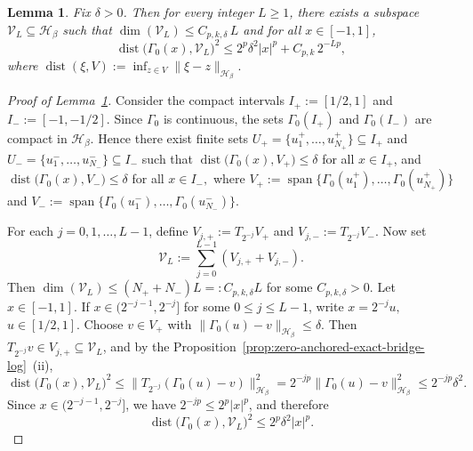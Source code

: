 \documentclass[11pt]{article}
\newtheorem{lemma}[theorem]{Lemma}
\theoremstyle{definition}
\begin{document}
\begin{lemma}\label{lem:dyadic-shell-approx-log}
Fix $\delta>0$. Then for every integer $L\ge 1$, there exists a subspace
\(
\mathcal V_L\subseteq \mathcal H_\beta
\)
such that
\(
\dim(\mathcal V_L)\le C_{p,k,\delta}\,L
\)
and for all \(x\in [-1,1]\),
\begin{equation}\label{eq:dyadic-shell-bound-log}
\operatorname{dist}\bigl(\Gamma_0(x),\mathcal V_L\bigr)^2
\le
2^p\delta^2 |x|^p + C_{p,k}\,2^{-Lp},
\end{equation}
where
\(
\operatorname{dist}(\xi,V):=\inf_{z\in V}\|\xi-z\|_{\mathcal H_\beta}.
\)
\end{lemma}
\begin{proof}[Proof of Lemma~\ref{lem:dyadic-shell-approx-log}]
    Consider the compact intervals
\(
I_+:=[1/2,1]\) and
\(
I_-:=[-1,-1/2].
\)
Since $\Gamma_0$ is continuous, the sets $\Gamma_0(I_+)$ and $\Gamma_0(I_-)$ are
compact in $\mathcal H_\beta$. Hence there exist finite sets
\(
U_+=\{u_1^+,\dots,u_{N_+}^+\}\subseteq I_+\)
and
\(
U_-=\{u_1^-,\dots,u_{N_-}^-\}\subseteq I_-
\)
such that
\(
\operatorname{dist}\bigl(\Gamma_0(x),V_+\bigr)\le \delta\) for all \(x\in I_+\), and
\(
\operatorname{dist}\bigl(\Gamma_0(x),V_-\bigr)\le \delta\) for all \(x\in I_{-},\)
where
\(
V_+:=\operatorname{span}\{\Gamma_0(u_1^+),\dots,\Gamma_0(u_{N_+}^+)\}
\)
and
\(
V_-:=\operatorname{span}\{\Gamma_0(u_1^-),\dots,\Gamma_0(u_{N_-}^-)\}.
\)

For each $j=0,1,\dots,L-1$, define
\(
V_{j,+}:=T_{2^{-j}}V_+\)
and
\(
V_{j,-}:=T_{2^{-j}}V_-.
\)
Now set
\[
\mathcal V_L:=\sum_{j=0}^{L-1}(V_{j,+}+V_{j,-}).
\]
Then
\(
\dim(\mathcal V_L)\le (N_++N_-)L=:C_{p,k,\delta}L
\) for some \(C_{p,k,\delta}>0.\) Let $x\in[-1,1]$. If $x\in(2^{-j-1},2^{-j}]$ for some $0\le j\le L-1$, write
\(
x=2^{-j}u,\) \(u\in[1/2,1].
\)
Choose $v\in V_+$ with
\(
\|\Gamma_0(u)-v\|_{\mathcal H_\beta}\le \delta.
\)
Then $T_{2^{-j}}v\in V_{j,+}\subseteq \mathcal V_L$, and by the Proposition~\ref{prop:zero-anchored-exact-bridge-log}~(ii),
\[
\operatorname{dist}\bigl(\Gamma_0(x),\mathcal V_L\bigr)^2
\le
\|T_{2^{-j}}(\Gamma_0(u)-v)\|_{\mathcal H_\beta}^2
=
2^{-jp}\|\Gamma_0(u)-v\|_{\mathcal H_\beta}^2
\le
2^{-jp}\delta^2.
\]
Since $x\in(2^{-j-1},2^{-j}]$, we have $2^{-jp}\le 2^p |x|^p$, and therefore
\[
\operatorname{dist}\bigl(\Gamma_0(x),\mathcal V_L\bigr)^2
\le
2^p\delta^2 |x|^p.
\]


\end{proof}
\end{document}
